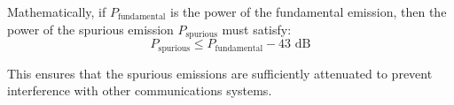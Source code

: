 Mathematically, if \( P_{\text{fundamental}} \) is the power of the fundamental emission, then the power of the spurious emission \( P_{\text{spurious}} \) must satisfy:
\[
P_{\text{spurious}} \leq P_{\text{fundamental}} - 43 \text{ dB}
\]

This ensures that the spurious emissions are sufficiently attenuated to prevent interference with other communications systems.

